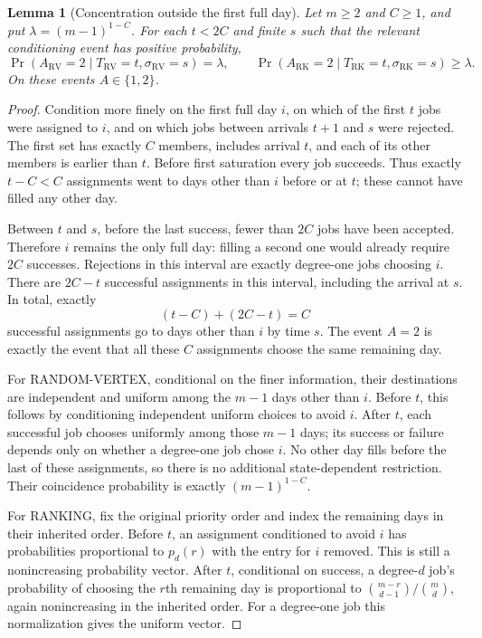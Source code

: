 \documentclass[11pt]{article}
\newtheorem{lemma}{Lemma}
\newcommand{\RV}{\mathrm{RV}}
\newcommand{\RK}{\mathrm{RK}}
\begin{document}
\begin{lemma}[Concentration outside the first full day]\label{lem:mark}
Let $m\geq2$ and $C\geq1$, and put $\lambda=(m-1)^{1-C}$.
For each $t<2C$ and finite $s$ such that the relevant conditioning event
has positive probability,
\[
 \Pr(A_\RV=2\mid T_\RV=t,\sigma_\RV=s)=\lambda,
 \qquad
 \Pr(A_\RK=2\mid T_\RK=t,\sigma_\RK=s)\geq\lambda.
\]
On these events $A\in\{1,2\}$.
\end{lemma}
\begin{proof}
Condition more finely on the first full day $i$, on which of the first
$t$ jobs were assigned to $i$, and on which jobs between arrivals $t+1$
and $s$ were rejected. The first set has exactly $C$ members, includes
arrival $t$, and each of its other members is earlier than $t$.
Before first saturation every job succeeds. Thus exactly $t-C<C$
assignments went to days other than $i$ before or at $t$; these cannot
have filled any other day.

Between $t$ and $s$, before the last success, fewer than $2C$ jobs have
been accepted. Therefore $i$ remains the only full day: filling a second
one would already require $2C$ successes. Rejections in this interval are
exactly degree-one jobs choosing $i$. There are $2C-t$ successful
assignments in this interval, including the arrival at $s$. In total,
exactly
\[
 (t-C)+(2C-t)=C
\]
successful assignments go to days other than $i$ by time $s$.
The event $A=2$ is exactly the event that all these $C$ assignments
choose the same remaining day.

For RANDOM-VERTEX, conditional on the finer information, their destinations
are independent and uniform among the $m-1$ days other than $i$.
Before $t$, this follows by conditioning independent uniform choices
to avoid $i$. After $t$, each successful job chooses uniformly among
those $m-1$ days; its success or failure depends only on whether a
degree-one job chose $i$. No other day fills before the last of these
assignments, so there is no additional state-dependent restriction.
Their coincidence probability is exactly $(m-1)^{1-C}$.

For RANKING, fix the original priority order and index the remaining days
in their inherited order. Before $t$, an assignment conditioned to avoid
$i$ has probabilities proportional to $p_d(r)$ with the entry for $i$
removed. This is still a nonincreasing probability vector. After $t$,
conditional on success, a degree-$d$ job's probability of choosing the
$r$th remaining day is proportional to
$\binom{m-r}{d-1}/\binom md$, again nonincreasing in the inherited order.
For a degree-one job this normalization gives the uniform vector.


\end{proof}
\end{document}
